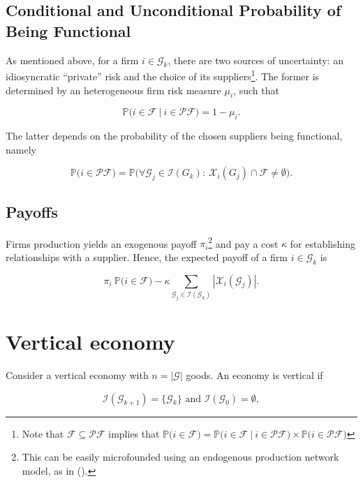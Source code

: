 \documentclass[american, abstract=on]{scrartcl}
\newcommand{\F}{\mathcal{F}}
\newcommand{\X}{\mathcal{X}}
\newcommand{\G}{\mathcal{G}}
\newcommand{\I}{\mathcal{I}}
\newcommand{\PF}{\mathcal{P} \F}
\renewcommand{\P}{\mathbb{P}}
\newcommand{\abs}[1]{\left\lvert#1\right\rvert}
\newcommand{\citein}[1]{\citeauthor{#1} (\citeyear{#1})}
\begin{document}
\subsection{Conditional and Unconditional Probability of Being Functional}

As mentioned above, for a firm $i \in \G_k$, there are two sources of uncertainty: an idiosyncratic ``private'' risk and the choice of its suppliers\footnote{Note that $\F \subseteq \PF$ implies that $\P\Big(i \in \F \Big) = \P\Big(i \in \F \ \vert \ i \in \PF \Big) \times \P\Big( i \in \PF \Big)$}. The former is determined by an heterogeneous firm risk measure $\mu_i$, such that  

\begin{equation}
  \P\Big(i \in \F \ \vert \ i \in \PF \Big) = 1 - \mu_i.
\end{equation}

The latter depends on the probability of the chosen suppliers being functional, namely

\begin{equation}
  \P\Big( i \in \PF \Big) = \P\Big( \forall \G_j \in \I(G_k): \ \X_i(G_j) \cap \F \neq \emptyset \Big).
\end{equation}

\subsection{Payoffs}

Firms production yields an exogenous payoff $\pi_i$\footnote{This can be easily microfounded using an endogenous production network model, as in \citein{acemoglu_endogenous_2020}.} and pay a cost $\kappa$ for establishing relationships with a supplier. Hence, the expected payoff of a firm $i \in \G_k$ is

\begin{equation}
  \pi_i \ \P\Big( i \in \F \Big) - \kappa \sum_{\G_j \in \I(\G_k)} \abs{\X_i(\G_j)}.
\end{equation}

\section{Vertical economy} \label{sec:vertical}

Consider a vertical economy with $n = \abs{\G}$ goods. An economy is vertical if 

\begin{equation}
  \I(\G_{k+1}) = \{ \G_k \} \text{ and } \I(\G_0) = \emptyset,
\end{equation}
\end{document}
